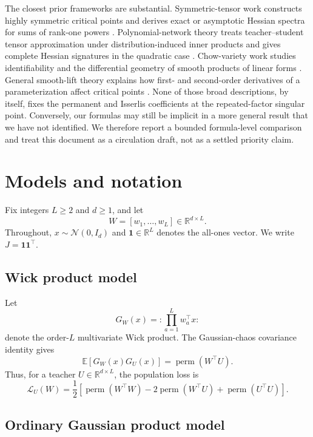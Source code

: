 \documentclass[11pt]{article}
\newcommand{\R}{\mathbb{R}}
\newcommand{\one}{\mathbf{1}}
\newcommand{\perm}{\operatorname{perm}}
\begin{document}
The closest prior frameworks are substantial.  Symmetric-tensor work constructs highly symmetric critical points and derives exact or asymptotic Hessian spectra for sums of rank-one powers \cite{arjevani_vinograd}.  Polynomial-network theory treats teacher--student tensor approximation under distribution-induced inner products and gives complete Hessian signatures in the quadratic case \cite{arjevani_polynomial}.  Chow-variety work studies identifiability and the differential geometry of smooth products of linear forms \cite{torrance_vannieuwenhoven,kubjas_geometry}.  General smooth-lift theory explains how first- and second-order derivatives of a parameterization affect critical points \cite{levin_kileel_boumal}.  None of those broad descriptions, by itself, fixes the permanent and Isserlis coefficients at the repeated-factor singular point.  Conversely, our formulas may still be implicit in a more general result that we have not identified.  We therefore report a bounded formula-level comparison and treat this document as a circulation draft, not as a settled priority claim.

\section{Models and notation}

Fix integers $L\geq2$ and $d\geq1$, and let
\[
W=[w_1,\ldots,w_L]\in\R^{d\times L}.
\]
Throughout, $x\sim\mathcal N(0,I_d)$ and $\one\in\R^L$ denotes the all-ones vector.  We write $J=\one\one^\top$.

\subsection{Wick product model}

Let
\[
G_W(x)=:\!\prod_{a=1}^{L}w_a^\top x\!:
\]
denote the order-$L$ multivariate Wick product.  The Gaussian-chaos covariance identity gives
\begin{equation}
\mathbb E[G_W(x)G_U(x)]=\perm(W^\top U).
\label{eq:wick-permanent}
\end{equation}
Thus, for a teacher $U\in\R^{d\times L}$, the population loss is
\begin{equation}
\mathcal L_U(W)
=\frac12\left[
\perm(W^\top W)-2\perm(W^\top U)+\perm(U^\top U)
\right].
\label{eq:wick-loss}
\end{equation}

\subsection{Ordinary Gaussian product model}
\end{document}
